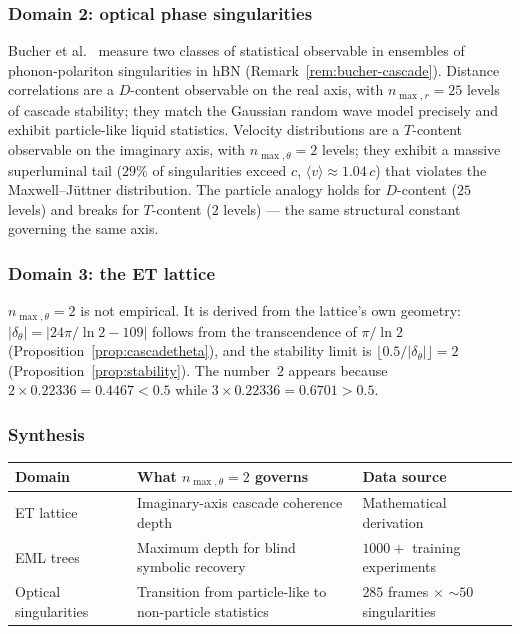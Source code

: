 \documentclass[11pt,a4paper]{article}
\theoremstyle{definition}
\theoremstyle{remark}
\begin{document}
\subsubsection*{Domain 2: optical phase singularities}

Bucher et al.~\cite{Bucher2025} measure two classes of statistical observable in ensembles of phonon-polariton singularities in hBN (Remark~\ref{rem:bucher-cascade}). Distance correlations are a $D$-content observable on the real axis, with $n_{\max,r}=25$ levels of cascade stability; they match the Gaussian random wave model precisely and exhibit particle-like liquid statistics. Velocity distributions are a $T$-content observable on the imaginary axis, with $n_{\max,\theta}=2$ levels; they exhibit a massive superluminal tail ($29\%$ of singularities exceed $c$, $\langle v\rangle \approx 1.04\,c$) that violates the Maxwell--J\"uttner distribution. The particle analogy holds for $D$-content ($25$ levels) and breaks for $T$-content ($2$ levels) --- the same structural constant governing the same axis.

\subsubsection*{Domain 3: the ET lattice}

$n_{\max,\theta}=2$ is not empirical. It is derived from the lattice's own geometry: $|\delta_{\theta}| = |24\pi/\ln 2 - 109|$ follows from the transcendence of $\pi/\ln 2$ (Proposition~\ref{prop:cascadetheta}), and the stability limit is $\lfloor 0.5/|\delta_{\theta}|\rfloor = 2$ (Proposition~\ref{prop:stability}). The number~$2$ appears because $2 \times 0.22336 = 0.4467 < 0.5$ while $3 \times 0.22336 = 0.6701 > 0.5$.

\subsubsection*{Synthesis}

\begin{center}
\begin{tabular}{@{}l l l@{}}
\toprule
Domain & What $n_{\max,\theta}=2$ governs & Data source\\
\midrule
ET lattice & Imaginary-axis cascade coherence depth & Mathematical derivation\\
EML trees~\cite{Odrzywolek2026} & Maximum depth for blind symbolic recovery & $1000+$ training experiments\\
Optical singularities~\cite{Bucher2025} & Transition from particle-like to non-particle statistics & $285$ frames $\times$ ${\sim}50$ singularities\\
\bottomrule
\end{tabular}
\end{center}
\end{document}
